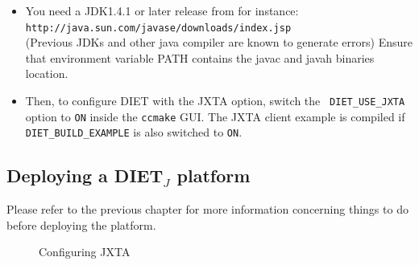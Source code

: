 \begin{itemize}
\item{You need a JDK1.4.1 or later release from for instance:\\
    \noindent
    {\footnotesize
      \texttt{http://java.sun.com/javase/downloads/index.jsp} }\\
      (Previous JDKs and other java compiler are known to generate
      errors) Ensure that environment variable PATH contains the javac
      and javah binaries location.}
  
\item{Then, to configure DIET with the JXTA option, switch the {\tt
    DIET\_USE\_JXTA} option to {\tt ON} inside the {\tt ccmake}
    GUI. The JXTA client example is compiled if {\tt
    DIET\_BUILD\_EXAMPLE} is also switched to {\tt ON}.}

\end{itemize}

\subsection {Deploying a DIET$_{J}$ platform}
\label{ssec:deployjxta}



Please refer to the previous chapter for more information concerning
things to do before deploying the platform.

\begin{figure}[htb]
 \begin{center}
  \caption{Configuring JXTA \label{fig:platformjxta}}
 \end{center}
\end{figure}


